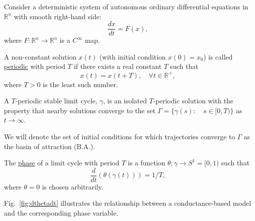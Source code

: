 \documentclass[12pt]{article}
\begin{document}
Consider a deterministic system of autonomous ordinary differential equations in $\mathbb{R}^n$ with smooth right-hand side:
  \begin{equation}
  \frac{dx}{dt} = F(x),
  \end{equation}
where $F : \mathbb{R}^n \rightarrow \mathbb{R}^n$ is a $C^\infty$ map.
\begin{definition}
 A non-constant solution $x(t)$ (with initial condition $x(0) = x_0$) is called \underline{periodic} with period $T$ if there exists a real constant $T$ such that 
\begin{equation}
 x(t) = x(t+T), \quad \forall t \in \mathbb{R}^+,
\end{equation}
where $T > 0$ is the least such number.
\end{definition}

\begin{definition}
 A $T$-periodic stable limit cycle, $\gamma$, is an isolated $T$-periodic solution with the property that nearby solutions converge to the set $\Gamma = \{\gamma(s): \quad s \in [0,T)\}$ as $t \rightarrow \infty$.
\end{definition}
  We will denote the set of initial conditions for which trajectories converge to $\Gamma$ as the basin of attraction (B.A.).

  \begin{definition} The \underline{phase} of a limit cycle with period $T$ is a function $\theta: \gamma \rightarrow S^1 = [0,1)$ such that
  \begin{equation}
  \frac{d}{dt}\left (\theta(\gamma(t)) \right ) = 1/T,
  \end{equation}
  where $\theta = 0$ is chosen arbitrarily.
  \end{definition}
  Fig.~\ref{fig:dthetadt} illustrates the relationship between a conductance-based model and the corresponding phase variable.
  
\end{document}
